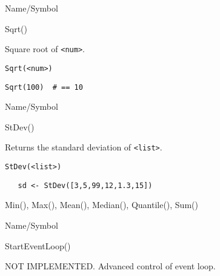 \rl



\begin{desc}{Name/Symbol}
\item[Name/Symbol]  	Sqrt() 

\item[Description]  	Square root of \verb+<num>+.

\item[Usage]        	
\begin{verbatim}
Sqrt(<num>)
\end{verbatim}

\item[Example]
\begin{verbatim}
Sqrt(100)  # == 10
\end{verbatim}

\item[See Also]	
\end{desc}

\rl


\begin{desc}{Name/Symbol}
\item[Name/Symbol]  	StDev() 

\item[Description]  Returns the standard deviation of \verb+<list>+.

\item[Usage]       	
\begin{verbatim}
StDev(<list>)        
\end{verbatim}

\item[Example]	
\begin{verbatim}
   sd <- StDev([3,5,99,12,1.3,15])        
\end{verbatim}

\item[See Also]     	Min(), Max(), Mean(), Median(), Quantile(), Sum()
\end{desc}

\rl


\begin{desc}{Name/Symbol}
\item[Name/Symbol]  	StartEventLoop()

\item[Description]  	NOT IMPLEMENTED. Advanced control of event loop.

\item[Usage]		

\item[Example]	

\item[See Also]	
\end{desc}

